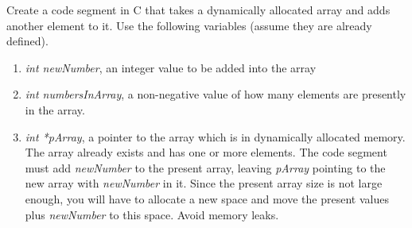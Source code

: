 \documentclass[12pt]{article}
\begin{document}
Create a code segment in C that takes a dynamically allocated array and adds another element to it. Use the following variables (assume they are already defined).
\begin{enumerate}
	\item \textit{int newNumber}, an integer value to be added into the array
	\item \textit{ int numbersInArray}, a non-negative value of how many elements are presently in the array.
	\item \textit{int *pArray}, a pointer to the array which is in dynamically allocated memory. The array already exists and has one or more elements. The code segment must add \textit{newNumber} to the present array, leaving \textit{pArray} pointing to the new array with \textit{newNumber} in it. Since the present array size is not large enough, you will have to allocate a new space and move the present values plus \textit{newNumber} to this space. Avoid memory leaks.
\end{enumerate}
\iffalse
\textbf{Example solution:}
\begin{lstlisting}[language=C]
int *extArray = (int *)malloc(sizeof(int) * (numInArray + 1));
extArray[0] = newNum; // add at first since easier

for (int i = 1; i <= numInArray; i++){
	extArray[i] = pArray[i - 1]; // transfer old stuff
}

free(pArray);
pArray = extArray; // reassign pointer to new array space
\end{lstlisting}
\fi
\end{document}
